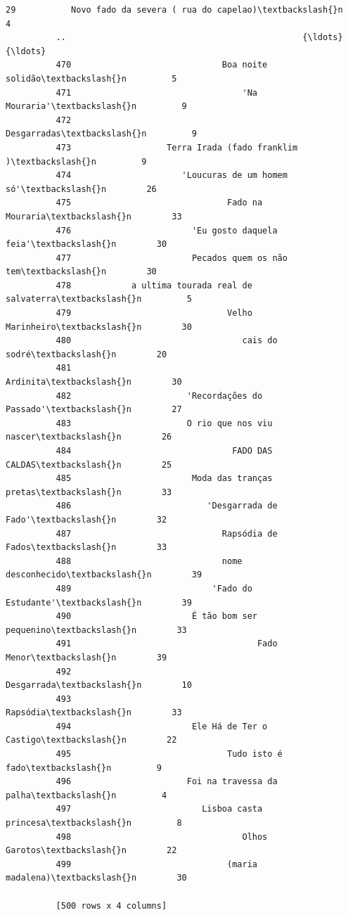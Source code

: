 \documentclass[11pt]{article}
\begin{document}
\begin{Verbatim}[commandchars=\\\{\}]
          29           Novo fado da severa ( rua do capelao)\textbackslash{}n         4  
          ..                                               {\ldots}       {\ldots}  
          470                              Boa noite solidão\textbackslash{}n         5  
          471                                  'Na Mouraria'\textbackslash{}n         9  
          472                                    Desgarradas\textbackslash{}n         9  
          473                   Terra Irada (fado franklim )\textbackslash{}n         9  
          474                      'Loucuras de um homem só'\textbackslash{}n        26  
          475                               Fado na Mouraria\textbackslash{}n        33  
          476                        'Eu gosto daquela feia'\textbackslash{}n        30  
          477                        Pecados quem os não tem\textbackslash{}n        30  
          478            a ultima tourada real de salvaterra\textbackslash{}n         5  
          479                               Velho Marinheiro\textbackslash{}n        30  
          480                                  cais do sodré\textbackslash{}n        20  
          481                                       Ardinita\textbackslash{}n        30  
          482                       'Recordações do Passado'\textbackslash{}n        27  
          483                       O rio que nos viu nascer\textbackslash{}n        26  
          484                                FADO DAS CALDAS\textbackslash{}n        25  
          485                        Moda das tranças pretas\textbackslash{}n        33  
          486                           'Desgarrada de Fado'\textbackslash{}n        32  
          487                              Rapsódia de Fados\textbackslash{}n        33  
          488                              nome desconhecido\textbackslash{}n        39  
          489                            'Fado do Estudante'\textbackslash{}n        39  
          490                        É tão bom ser pequenino\textbackslash{}n        33  
          491                                     Fado Menor\textbackslash{}n        39  
          492                                     Desgarrada\textbackslash{}n        10  
          493                                       Rapsódia\textbackslash{}n        33  
          494                        Ele Há de Ter o Castigo\textbackslash{}n        22  
          495                               Tudo isto é fado\textbackslash{}n         9  
          496                       Foi na travessa da palha\textbackslash{}n         4  
          497                          Lisboa casta princesa\textbackslash{}n         8  
          498                                  Olhos Garotos\textbackslash{}n        22  
          499                               (maria madalena)\textbackslash{}n        30  
          
          [500 rows x 4 columns]
\end{Verbatim}
            
\end{document}
